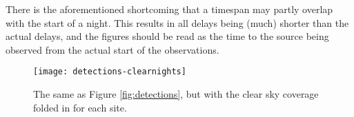 \documentclass[twocolumn]{article}
\begin{document}
There is the aforementioned shortcoming that a timespan may partly
overlap with the start of a night. This results in all delays being (much) shorter than the actual delays, and the figures should be read as the time to the source being observed from the actual start of the observations.



\begin{figure*}
  \texttt{[image: detections-clearnights]}
  \caption{The same as Figure \ref{fig:detections}, but with the clear sky coverage folded in for each site.}
  \label{fig:detections-clear}
\end{figure*}




\end{document}
